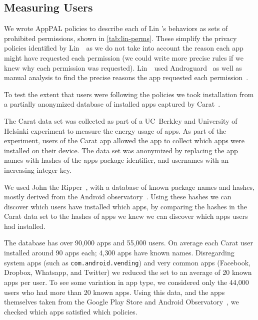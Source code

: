 \documentclass[thesis.tex]{subfiles}
\begin{document}
\subsection{Measuring Users}

We wrote AppPAL policies to describe
each of Lin \etal's behaviors as sets of prohibited permissions, shown in
\autoref{tab:lin-perms}.  These simplify the privacy policies
identified by Lin~\etal~as we do not take into account the reason each
app might have requested each permission (we could write more precise
rules if we knew why each permission was requested).  Lin~\etal~used
Androguard~\cite{andrew_desnos_androguard_2012} as well as manual
analysis to find the precise reasons the app requested each
permission~\cite{lin_modeling_2014}.

To test the extent that users were following the policies we took
installation from a partially anonymized database of installed apps
captured by Carat~\cite{oliner_carat:_2013}.

The Carat data set was collected as part of a UC~Berkley and University
of Helsinki experiment to measure the energy usage of apps.  As part
of the experiment, users of the Carat app allowed the app to collect
which apps were installed on their device.  The data set was anonymized
by replacing the app names with hashes of the apps package identifier,
and usernames with an increasing integer key.

We used John the Ripper~\cite{solar_designer_john_2013}, with a
database of known package names and hashes, mostly derived from the
Android observatory~\cite{barrera_understanding_2012}.  Using these
hashes we can discover which users have installed which apps, by
comparing the hashes in the Carat data set to the hashes of apps we
knew we can discover which apps users had installed.

The database has over 90,000 apps and 55,000 users.  On average each
Carat user installed around 90 apps each; 4,300 apps have known names.
Disregarding system apps (such as \texttt{com.android.vending}) and
very common apps (Facebook, Dropbox, Whatsapp, and Twitter) we reduced
the set to an average of 20 known apps per user.  To see some
variation in app type, we considered only the 44,000 users who had
more than 20 known apps.  Using this data, and the apps themselves
taken from the Google Play Store and Android
Observatory~\cite{barrera_understanding_2012}, we checked which apps
satisfied which policies.
\end{document}
